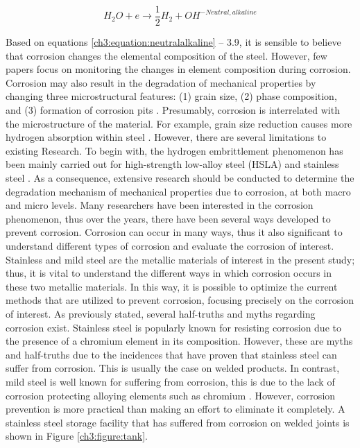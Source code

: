 \documentclass[12pt]{report}
\begin{document}
\begin{equation}
    H_2O + e \rightarrow \frac{1}{2}H_2 + OH^{-Neutral,alkaline}
    \label{ch3:equation:neutralalkaline}
\end{equation}

Based on equations \ref{ch3:equation:neutralalkaline} – 3.9, it is sensible to believe that corrosion changes the elemental composition of the steel. However, few papers focus on monitoring the changes in element composition during corrosion. Corrosion may also result in the degradation of mechanical properties by changing three microstructural features: (1) grain size, (2) phase composition, and (3) formation of corrosion pits \cite{li2018effect}. Presumably, corrosion is interrelated with the microstructure of the material. For example, grain size reduction causes more hydrogen absorption within steel \cite{li2018effect}. However, there are several limitations to existing Research. To begin with, the hydrogen embrittlement phenomenon has been mainly carried out for high-strength low-alloy steel (HSLA) and stainless steel \cite{li2018effect}. As a consequence, extensive research should be conducted to determine the degradation mechanism of mechanical properties due to corrosion, at both macro and micro levels.  
Many researchers have been interested in the corrosion phenomenon, thus over the years, there have been several ways developed to prevent corrosion. Corrosion can occur in many ways, thus it also significant to understand different types of corrosion and evaluate the corrosion of interest. Stainless and mild steel are the metallic materials of interest in the present study; thus, it is vital to understand the different ways in which corrosion occurs in these two metallic materials. In this way, it is possible to optimize the current methods that are utilized to prevent corrosion, focusing precisely on the corrosion of interest.
As previously stated, several half-truths and myths regarding corrosion exist. Stainless steel is popularly known for resisting corrosion due to the presence of a chromium element in its composition. However, these are myths and half-truths due to the incidences that have proven that stainless steel can suffer from corrosion. This is usually the case on welded products. In contrast, mild steel is well known for suffering from corrosion, this is due to the lack of corrosion protecting alloying elements such as chromium \cite{hackerman1987theory}. However, corrosion prevention is more practical than making an effort to eliminate it completely. A stainless steel storage facility that has suffered from corrosion on welded joints is shown in Figure \ref{ch3:figure:tank}.
 
\end{document}
